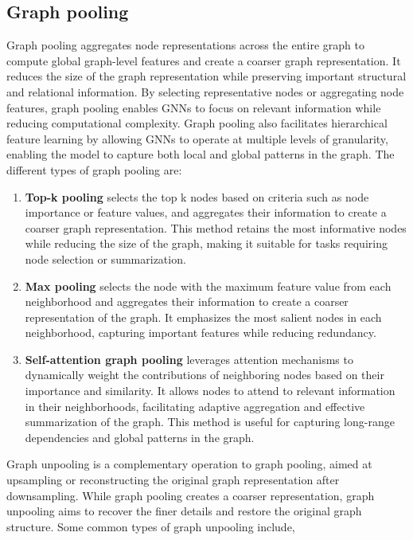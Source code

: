 \subsection{Graph pooling}
Graph pooling aggregates node representations across the entire graph to compute global graph-level features and create a coarser graph representation. It reduces the size of the graph representation while preserving important structural and relational information. By selecting representative nodes or aggregating node features, graph pooling enables GNNs to focus on relevant information while reducing computational complexity. Graph pooling also facilitates hierarchical feature learning by allowing GNNs to operate at multiple levels of granularity, enabling the model to capture both local and global patterns in the graph. The different types of graph pooling are:
\begin{enumerate}
\item \textbf{Top-k pooling} selects the top k nodes based on criteria such as node importance or feature values, and aggregates their information to create a coarser graph representation. This method retains the most informative nodes while reducing the size of the graph, making it suitable for tasks requiring node selection or summarization.
\item \textbf{Max pooling} selects the node with the maximum feature value from each neighborhood and aggregates their information to create a coarser representation of the graph. It emphasizes the most salient nodes in each neighborhood, capturing important features while reducing redundancy.
\item \textbf{Self-attention graph pooling} leverages attention mechanisms to dynamically weight the contributions of neighboring nodes based on their importance and similarity. It allows nodes to attend to relevant information in their neighborhoods, facilitating adaptive aggregation and effective summarization of the graph. This method is useful for capturing long-range dependencies and global patterns in the graph.
\end{enumerate}
Graph unpooling is a complementary operation to graph pooling, aimed at upsampling or reconstructing the original graph representation after downsampling. While graph pooling creates a coarser representation, graph unpooling aims to recover the finer details and restore the original graph structure. Some common types of graph unpooling include,

